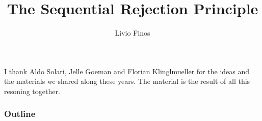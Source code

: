 \documentclass[xcolor={pdftex,dvipsnames,table}]{beamer}
\title{The Sequential Rejection Principle}
\author{Livio Finos}
\date{}%
\begin{document}
\begin{frame}[fragile]
\titlepage
\end{frame}

\begin{frame}
I thank Aldo Solari, Jelle Goeman and Florian Klinglmueller for the ideas and the materials we shared along these years. The material is the result of all this resoning together.
\end{frame}

\begin{frame}
\frametitle{Outline}
\tableofcontents
\end{frame}
% 
\end{document}
